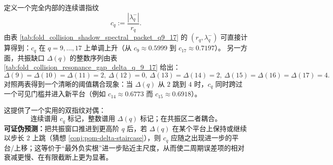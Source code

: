 \begin{remark}\label{rem:pom-delta-cq-threshold}
定义一个完全内部的连续谱指纹
\[
c_q:=\frac{|\lambda_q^-|}{r_q}.
\]
由表 \ref{tab:fold_collision_shadow_spectral_packet_q9_17} 的 \((r_q,\lambda_q^-)\) 可直接计算得到：\(c_q\) 在 \(q=9,\dots,17\) 上单调上升（从 \(c_9\approx 0.5999\) 到 \(c_{17}\approx 0.7197\)）。
另一方面，共振缺口 \(\Delta(q)\) 的整数序列由表 \ref{tab:fold_collision_resonance_gap_delta_q_9_17} 给出：
\[
\Delta(9)=\Delta(10)=\Delta(11)=2,\ \Delta(12)=0,\ \Delta(13)=\Delta(14)=2,\ \Delta(15)=\Delta(16)=\Delta(17)=4.
\]
对照两表得到一个清晰的阈值耦合现象：当 \(\Delta(q)\) 从 \(2\) 跳到 \(4\) 时，\(c_q\) 同时跨过一个可见门槛并进入新平台（例如 \(c_{14}\approx 0.6773\) 而 \(c_{15}\approx 0.6918\)）。
\par
这提供了一个实用的双指纹对偶：
\[
\boxed{\ \text{连续谱用 }c_q\text{ 标记，整数谱用 }\Delta(q)\text{ 标记；在共振区二者耦合。}\ }
\]
\textbf{可证伪预测：}把共振窗口推进到更高阶 \(q\) 后，若 \(\Delta(q)\) 在某个平台上保持或继续以步长 \(2\) 上跳（猜想 \ref{conj:pom-delta-staircase}），则 \(c_q\) 应随之出现进一步的平台/上移；这等价于“最外负实根”进一步贴近主尺度，从而使二周期误差项的相对衰减更慢、在有限截断上更为显著。
\end{remark}

